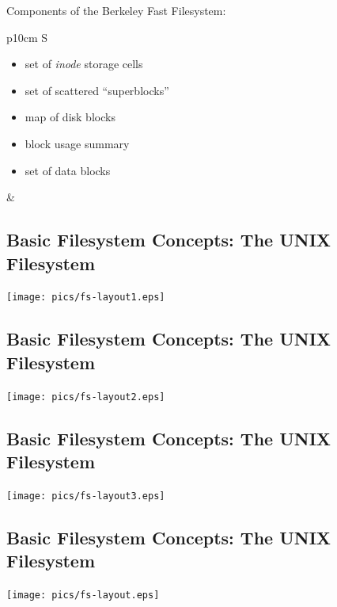 \documentclass[xga]{xdvislides}
\begin{document}
Components of the Berkeley Fast Filesystem:
\\

\begin{tabular}{ p{10cm} S }
\begin{itemize}
	\item set of {\em inode} storage cells
	\item set of scattered ``superblocks''
	\item map of disk blocks
	\item block usage summary
	\item set of data blocks
\end{itemize}
&  \\
\end{tabular}

\subsection{Basic Filesystem Concepts: The UNIX Filesystem}
\begin{center}
\texttt{[image: pics/fs-layout1.eps]} \\
\end{center}
\vspace*{\fill}

\subsection{Basic Filesystem Concepts: The UNIX Filesystem}
\begin{center}
\texttt{[image: pics/fs-layout2.eps]} \\
\end{center}
\vspace*{\fill}

\subsection{Basic Filesystem Concepts: The UNIX Filesystem}
\begin{center}
\texttt{[image: pics/fs-layout3.eps]} \\
\end{center}
\vspace*{\fill}

\subsection{Basic Filesystem Concepts: The UNIX Filesystem}
\begin{center}
\texttt{[image: pics/fs-layout.eps]} \\
\end{center}
\vspace*{\fill}
\end{document}
